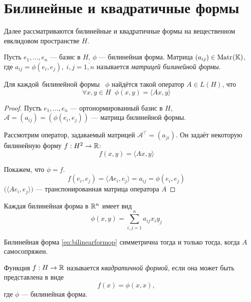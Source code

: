 \section{Билинейные и квадратичные формы}
Далее рассматриваются билинейные и квадратичные формы на вещественном евклидовом
пространстве $H$.

\begin{definition}
    Пусть $e_1, \dotsc, e_n$ --- базис в $H$, $\phi$ --- билинейная форма.
    Матрица $(a_{ij}) \in \mathrm{Matr}_{}({\mathbb{K}})$, где $a_{ij} = \phi(e_i, e_j), \; i, j =
    \overline{1, n}$ называется \emph{матрицей билинейной формы}.
\end{definition}

\begin{theorem}\label{th:bilinearformop}
    Для каждой \,билинейной формы \, $\phi$ найдётся такой оператор $A \in L(H)$, что
    \begin{equation}\label{eq:bilinearformop}
        \forall x, y \in H \;\; \phi(x, y) = \langle Ax, y\rangle 
    \end{equation}
\end{theorem}

\begin{proof}
    Пусть $e_1, \dotsc, e_n$ --- ортонормированный базис в $H$, $\mathcal{A} =
    (a_{ij}) = (\phi(e_i, e_j))$ --- матрица билинейной формы.

    Рассмотрим оператор, задаваемый матрицей $\mathcal{A}^\top = (a_{ji})$. Он
    задаёт некоторую билинейную форму $f: H^2 \to \mathbb{R}$:
    \[ f(x, y) = \langle Ax, y\rangle \]

    Покажем, что $\phi = f$. 
    \[ f(e_i, e_j) = \langle Ae_i, e_j\rangle = a_{ij} = \phi(e_i, e_j) \]
    $\big(\langle Ae_i, e_j\rangle\big)$ --- транспонированная матрица оператора $A$
\end{proof}

\begin{corollaryth}
    Каждая билинейная форма в $\mathbb{R}^n$ имеет вид
    \[ \phi(x,y) = \sum_{i,j = 1}^n a_{ij} x_i y_j \]
\end{corollaryth}

\begin{corollaryth}
    Билинейная форма \eqref{eq:bilinearformop} симметрична тогда и только тогда,
    когда $A$ самосопряжен.
\end{corollaryth}

\begin{definition}
    Функция $f: H \to \mathbb{R}$ называется \emph{квадратичной формой}, если она может
    быть представлена в виде
    \[ f(x) = \phi(x, x), \]
    где $\phi$ --- билинейная форма.
\end{definition}

